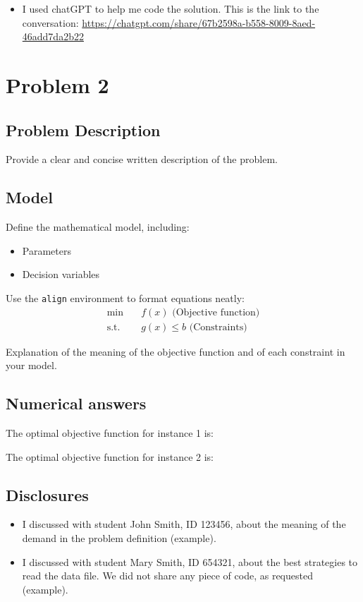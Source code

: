 \documentclass[a4paper,12pt]{article}
\begin{document}
\begin{itemize}
    \item I used chatGPT to help me code the solution. This is the link to the conversation: \href{https://chatgpt.com/share/67b2598a-b558-8009-8aed-46add7da2b22}{https://chatgpt.com/share/67b2598a-b558-8009-8aed-46add7da2b22}
\end{itemize}

\newpage


\section{Problem 2}

\subsection{Problem Description}
Provide a clear and concise written description of the problem.

\subsection{Model}
Define the mathematical model, including:
\begin{itemize}
    \item Parameters
    \item Decision variables
\end{itemize}
Use the \texttt{align} environment to format equations neatly:
\begin{align}
    \min \quad & f(x) \text{ (Objective function)} \\
    \text{s.t.} \quad & g(x) \leq b \text{ (Constraints)}
\end{align}

Explanation of the meaning of the objective function and of each constraint in your model.

\subsection{Numerical answers}

The optimal objective function for instance 1 is: 

\noindent The optimal objective function for instance 2 is: 


\subsection{Disclosures}

\begin{itemize}
    \item I discussed with student John Smith, ID 123456, about the meaning of the demand in the problem definition (example).
    \item I discussed with student Mary Smith, ID 654321, about the best strategies to read the data file. We did not share any piece of code, as requested (example).
\end{itemize}
\end{document}

